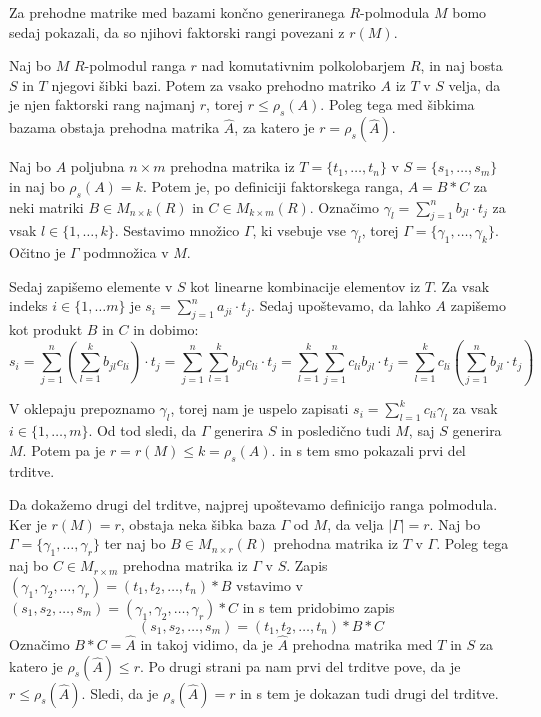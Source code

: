 \documentclass[mat1]{fmfdelo}
\newcommand{\abs}[1]{\ensuremath{\lvert #1 \rvert}}
\begin{document}
Za prehodne matrike med bazami končno generiranega $R$-polmodula $M$ bomo sedaj pokazali, da so njihovi faktorski rangi povezani z $r(M)$.

\begin{izrek}\label{izr:transmatfakrang}
	Naj bo $M$ $R$-polmodul ranga $r$ nad komutativnim polkolobarjem $R$, in naj bosta $S$ in $T$ njegovi šibki bazi. Potem za vsako prehodno matriko $A$ iz $T$ v $S$ velja, da je njen faktorski rang najmanj $r$, torej $r \leq \rho_s(A)$. Poleg tega med šibkima bazama obstaja prehodna matrika $\widehat{A}$, za katero je $r = \rho_s(\widehat{A})$.
\end{izrek}

\begin{dokaz}
		Naj bo $A$ poljubna $n\times m$ prehodna matrika iz $T = \{t_1, \ldots, t_n\}$ v $S = \{s_1, \ldots, s_m\}$ in naj bo $\rho_s(A) = k$. Potem je, po definiciji faktorskega ranga, $A = B*C$ za neki matriki $B\in M_{n\times k}(R)$ in $C\in M_{k\times m}(R)$. Označimo $\gamma_l =\sum_{j = 1}^{n}b_{jl}\cdot t_j$ za vsak $l\in \{1, \ldots, k\}$. Sestavimo množico $\Gamma$, ki vsebuje vse $\gamma_l$, torej $\Gamma = \{\gamma_1, \ldots, \gamma_k\}$. Očitno je $\Gamma$ podmnožica v $M$.
		
		Sedaj zapišemo elemente v $S$ kot linearne kombinacije elementov iz $T$. Za vsak indeks $i\in\{1, \ldots m\}$ je $s_i = \sum_{j = 1}^{n} a_{ji}\cdot t_j$. Sedaj upoštevamo, da lahko $A$ zapišemo kot produkt $B$ in $C$ in dobimo:  $$s_i = \sum_{j=1}^{n} \left(\sum_{l = 1}^{k}b_{jl}c_{li}\right)\cdot t_j = \sum_{j=1}^{n}\sum_{l = 1}^{k}b_{jl}c_{li}\cdot t_j = \sum_{l=1}^{k}\sum_{j = 1}^{n}c_{li}b_{jl}\cdot t_j = \sum_{l=1}^{k}c_{li}\left(\sum_{j = 1}^{n}b_{jl}\cdot t_j\right)$$
		
		V oklepaju prepoznamo $\gamma_l$, torej nam je uspelo zapisati $s_i = \sum_{l = 1}^{k} c_{li}\gamma_l$ za vsak $i\in \{1, \ldots, m\}$. Od tod sledi, da $\Gamma$ generira $S$ in posledično tudi $M$, saj $S$ generira $M$. Potem pa je $r = r(M) \leq k = \rho_s(A).$ in s tem smo pokazali prvi del trditve.
		
		Da dokažemo drugi del trditve, najprej upoštevamo definicijo ranga polmodula. Ker je $r(M) = r$, obstaja neka šibka baza $\Gamma$ od $M$, da velja $\abs{\Gamma} = r$. Naj bo $\Gamma = \{\gamma_1, \ldots, \gamma_r\}$ ter naj bo $B \in M_{n\times r}(R)$ prehodna matrika iz $T$ v $\Gamma$. Poleg tega naj bo $C\in M_{r\times m}$ prehodna matrika iz $\Gamma$ v $S$. Zapis $(\gamma_1, \gamma_2, \ldots, \gamma_r) = (t_1, t_2, \ldots, t_n)*B$ vstavimo v $(s_1, s_2, \ldots, s_m) = (\gamma_1, \gamma_2, \ldots, \gamma_r)*C$ in s tem pridobimo zapis $$(s_1, s_2, \ldots, s_m) = (t_1, t_2, \ldots, t_n)*B*C$$ Označimo $B*C = \widehat{A}$ in takoj vidimo, da je $\widehat{A}$ prehodna matrika med $T$ in $S$ za katero je $\rho_s(\widehat{A}) \leq r$. Po drugi strani pa nam prvi del trditve pove, da je $r \leq \rho_s(\widehat{A})$. Sledi, da je $\rho_s(\widehat{A}) = r$ in s tem je dokazan tudi drugi del trditve.
\end{dokaz}
\end{document}
